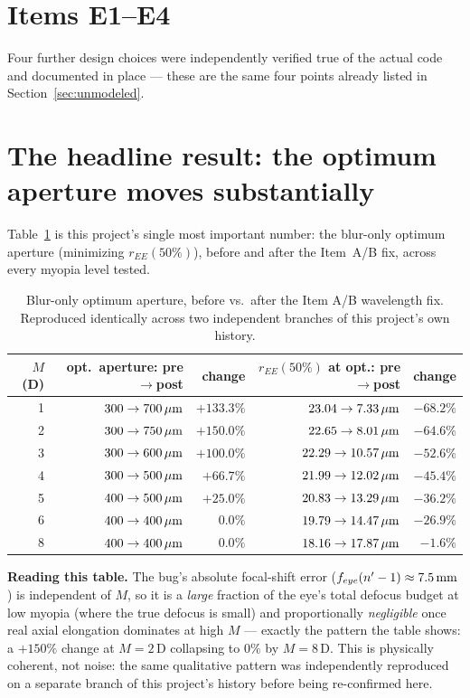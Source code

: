 \section{Items E1--E4}

Four further design choices were independently verified true of the actual code and
documented in place --- these are the same four points already listed in
Section~\ref{sec:unmodeled}.

\section{The headline result: the optimum aperture moves substantially}

Table~\ref{tab:audit-before-after} is this project's single most important number: the
blur-only optimum aperture (minimizing $r_{EE}(50\%)$), before and after the Item~A/B
fix, across every myopia level tested.

\begin{table}[htbp]
\centering
\begin{tabular}{rrrrr}
\toprule
$M$ (D) & opt.\ aperture: pre$\to$post & change & $r_{EE}(50\%)$ at opt.: pre$\to$post & change \\
\midrule
1 & $300\to700\,\mu\text{m}$  & $+133.3\%$ & $23.04\to7.33\,\mu\text{m}$  & $-68.2\%$ \\
2 & $300\to750\,\mu\text{m}$  & $+150.0\%$ & $22.65\to8.01\,\mu\text{m}$  & $-64.6\%$ \\
3 & $300\to600\,\mu\text{m}$  & $+100.0\%$ & $22.29\to10.57\,\mu\text{m}$ & $-52.6\%$ \\
4 & $300\to500\,\mu\text{m}$  & $+66.7\%$  & $21.99\to12.02\,\mu\text{m}$ & $-45.4\%$ \\
5 & $400\to500\,\mu\text{m}$  & $+25.0\%$  & $20.83\to13.29\,\mu\text{m}$ & $-36.2\%$ \\
6 & $400\to400\,\mu\text{m}$  & $0.0\%$    & $19.79\to14.47\,\mu\text{m}$ & $-26.9\%$ \\
8 & $400\to400\,\mu\text{m}$  & $0.0\%$    & $18.16\to17.87\,\mu\text{m}$ & $-1.6\%$ \\
\bottomrule
\end{tabular}
\caption{Blur-only optimum aperture, before vs.\ after the Item A/B wavelength fix.
Reproduced identically across two independent branches of this project's own history.}
\label{tab:audit-before-after}
\end{table}

\textbf{Reading this table.} The bug's absolute focal-shift error
($f_{eye}(n'-1)\approx7.5\,\text{mm}$) is independent of $M$, so it is a \emph{large} fraction
of the eye's total defocus budget at low myopia (where the true defocus is small) and
proportionally \emph{negligible} once real axial elongation dominates at high $M$ ---
exactly the pattern the table shows: a $+150\%$ change at $M=2\,$D collapsing to $0\%$
by $M=8\,$D. This is physically coherent, not noise: the same qualitative pattern was
independently reproduced on a separate branch of this project's history before being
re-confirmed here.

